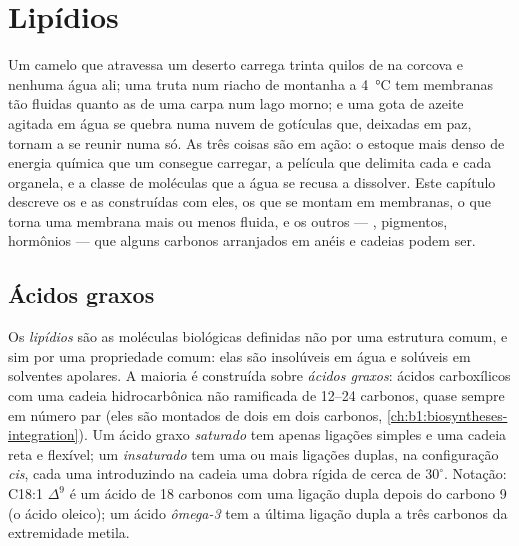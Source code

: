 \chapter{Lipídios}\label{ch:b1:lipids}

Um camelo que atravessa um deserto carrega trinta quilos de  na
corcova e nenhuma água ali; uma truta num riacho de montanha a
\qty{4}{\celsius} tem membranas tão fluidas quanto as de uma carpa num
lago morno; e uma gota de azeite agitada em água se quebra numa nuvem de
gotículas que, deixadas em paz, tornam a se reunir numa só. As três
coisas são  em ação: o estoque mais denso de energia química que
um  consegue carregar, a película que delimita cada  e
cada organela, e a classe de moléculas que a água se recusa a
dissolver. Este capítulo descreve os  e as 
construídas com eles, os   que se montam em
membranas, o que torna uma membrana mais ou menos fluida, e os outros
 --- , pigmentos, hormônios --- que alguns carbonos
arranjados em anéis e cadeias podem ser.

\section{Ácidos graxos}

\begin{definition}\label{def:b1:lipids:fattyacid}
Os \emph{lipídios} são as moléculas biológicas definidas
não por uma estrutura comum, e sim por uma propriedade comum: elas são
insolúveis em água e solúveis em solventes apolares. A maioria é
construída sobre \emph{ácidos graxos}: ácidos
carboxílicos com uma cadeia hidrocarbônica não ramificada de
\qtyrange{12}{24}{} carbonos, quase sempre em número par (eles são
montados de dois em dois carbonos,
\cref{ch:b1:biosyntheses-integration}). Um ácido graxo
\emph{saturado} tem apenas ligações simples
e uma cadeia reta e flexível; um
\emph{insaturado} tem uma ou mais ligações
duplas, na configuração \emph{cis}, cada uma introduzindo na cadeia uma
dobra rígida de cerca de $30^\circ$. Notação: C18:1 $\Delta^9$ é um
ácido de 18 carbonos com uma ligação dupla depois do carbono 9 (o ácido
oleico); um ácido \emph{ômega-3} tem a última ligação dupla a três
carbonos da extremidade metila.
\end{definition}

